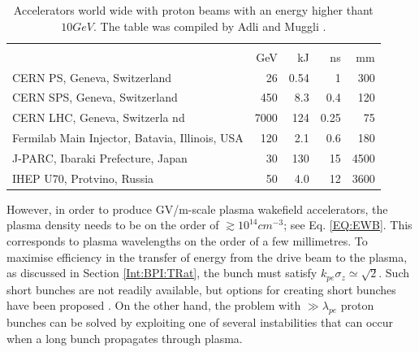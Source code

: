 \begin{table}[hbt]
    \centering
    \caption{Accelerators world wide with proton beams with an energy higher thant $10\unit{GeV}$. The table was compiled by Adli and Muggli \cite{adli:2016b}.}
    \label{T:ProtonBeams}
    \begin{tabularx}{\textwidth}{X d{1} d{1} d{1} d{1}}
            &  &  \\
            & \unit{GeV} & \unit{kJ} & \unit{ns} & \unit{mm} \\
        \hline
        CERN PS, Geneva, Switzerland \cite{assmann:2009}
            &   26 &   0.54 &  1    &  300 \\
        CERN SPS, Geneva, Switzerland \cite{assmann:2009}
            &  450 &   8.3  &  0.4  &  120 \\
        CERN LHC, Geneva, Switzerla nd \cite{assmann:2009}
            & 7000 & 124    &  0.25 &   75 \\
        Fermilab Main Injector, Batavia, Illinois, USA \cite{nagaitsev:2014}
            &  120 &   2.1  &  0.6  &  180 \\
        J-PARC, Ibaraki Prefecture, Japan \cite{hotchi:2012}
            &   30 & 130    & 15    & 4500 \\
        IHEP U70, Protvino, Russia \cite{ivanov:2014}
            &   50 &   4.0  & 12    & 3600 \\
        \hline
    \end{tabularx}
\end{table}

However, in order to produce GV/m-scale plasma wakefield accelerators, the plasma density needs to be on the order of $\gtrsim 10^{14}\unit{cm}^{-3}$; see Eq. \ref{EQ:EWB}. This corresponds to plasma wavelengths on the order of a few millimetres. To maximise efficiency in the transfer of energy from the drive beam to the plasma, as discussed in Section \ref{Int:BPI:TRat}, the bunch must satisfy $k_{pe}\sigma_{z} \simeq \sqrt{2}$. Such short bunches are not readily available, but options for creating short bunches have been proposed \cite{assmann:2009}. On the other hand, the problem with $\gg\lambda_{pe}$ proton bunches can be solved by exploiting one of several instabilities that can occur when a long bunch propagates through plasma.

